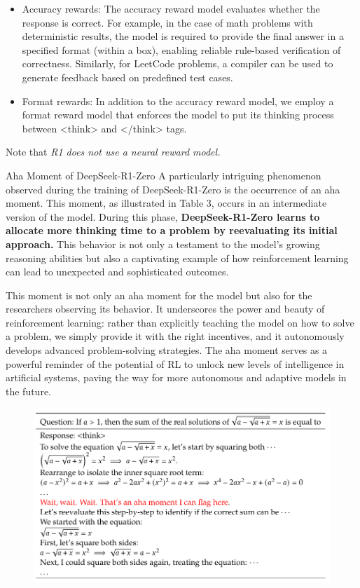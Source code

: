 \begin{itemize}
	\item Accuracy rewards: The accuracy reward model evaluates whether the response is correct. For example, in the case of math problems with deterministic results, the model is required to provide the final answer in a specified format (\eg within a box), enabling reliable rule-based verification of correctness. Similarly, for LeetCode problems, a compiler can be used to generate feedback based on predefined test cases. 
	\item Format rewards: In addition to the accuracy reward model, we employ a format reward model that enforces the model to put its thinking process between <think> and </think> tags.
\end{itemize}

Note that \textit{R1 does not use a neural reward model.}

Aha Moment of DeepSeek-R1-Zero A particularly intriguing phenomenon observed during the training of DeepSeek-R1-Zero is the occurrence of an aha moment. This moment, as illustrated in Table 3, occurs in an intermediate version of the model. During this phase, \textbf{DeepSeek-R1-Zero learns to allocate more thinking time to a problem by reevaluating its initial approach.} This behavior is not only a testament to the model's growing reasoning abilities but also a captivating example of how reinforcement learning can lead to unexpected and sophisticated outcomes.

This moment is not only an aha moment for the model but also for the researchers observing its behavior. It underscores the power and beauty of reinforcement learning: rather than explicitly teaching the model on how to solve a problem, we simply provide it with the right incentives, and it autonomously develops advanced problem-solving strategies. The aha moment serves as a powerful reminder of the potential of RL to unlock new levels of intelligence in artificial systems, paving the way for more autonomous and adaptive models in the future.

\begin{figure}[t]
	\centering
	\includegraphics[scale=0.5]{./images/DeepSeek/aha_moment.png}
\end{figure}

